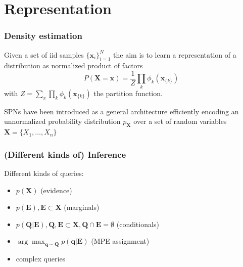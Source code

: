 \documentclass[10pt, t, xcolor={usenames,dvipsnames,svgnames}, compress]{beamer}
\begin{document}
\section{Representation}
{
  \begin{frame}[c]
    \sectionpage
  \end{frame}
}

\begin{frame}
  \frametitle{Density estimation}

Given a set of iid samples $\{\mathbf x_i\}_{i=1}^N$ the aim is to learn a
representation of a distribution as normalized product of factors
$$P(\mathbf X = \mathbf x) = \frac{1}{Z}\prod_k \phi_k(\mathbf x_{\{k\}})$$
with $Z = \sum_x\prod_k \phi_k(\mathbf x_{\{k\}})$ the partition function.

SPNs have been introduced as a general architecture efficiently encoding an
unnormalized probability distribution $p_{\mathbf X}$ over a set of random 
variables $\mathbf X = \{X_1 , \ldots, X_n \}$


\end{frame}

\begin{frame}
  \frametitle{(Different kinds of) Inference}
  Different kinds of queries:
  \begin{itemize}
  \item $p(\mathbf{X})$ (evidence)
  \item $p(\mathbf{E}), \mathbf{E}\subset\mathbf{X}$ (marginals)
  \item $p(\mathbf{Q}|\mathbf{E}), \mathbf{Q},
    \mathbf{E}\subset\mathbf{X}, \mathbf{Q}\cap \mathbf{E}=\emptyset$ (conditionals)
  \item
    $\arg\max_{\mathbf{q}\sim\mathbf{Q}}p(\mathbf{q}|\mathbf{E})$
    (MPE assignment)
    \item complex queries
  \end{itemize}
\end{frame}
\end{document}
